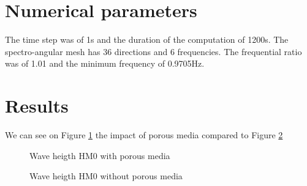 %
%
\section{Numerical parameters}
%
The time step was of 1s and the duration of the computation of 1200s. The spectro-angular mesh has 36 directions and 6 frequencies. The frequential ratio was of 1.01 and the minimum frequency of 0.9705Hz.

\section{Results}
We can see on Figure \ref{resPorous} the impact of porous media compared to Figure \ref{ressans}
\begin{figure} [!h]
\centering
{}
 \caption{Wave heigth HM0 with porous media}
\label{resPorous}
\end{figure}
\begin{figure} [!h]
\centering
{}
 \caption{Wave heigth HM0 without porous media}
\label{ressans}
\end{figure}
